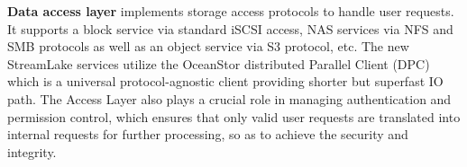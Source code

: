 




\noindent \textbf{Data access layer} implements storage access protocols to handle user requests. It supports a block service via standard iSCSI access, NAS services via NFS and SMB protocols as well as an object service via S3 protocol, etc.
The new StreamLake services utilize the OceanStor distributed Parallel Client (DPC) which is a universal protocol-agnostic client providing shorter but superfast IO path. 
The Access Layer also plays a crucial role in managing authentication and  permission control, which ensures that only valid user requests are translated into internal requests for further processing, so as to achieve  the security and integrity.
 
 

 
 
 
 
 
 